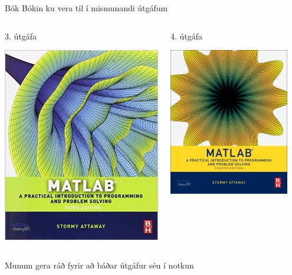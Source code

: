 \documentclass{beamer}
\begin{document}
\begin{frame}{Bók}
Bókin ku vera til í mismunandi útgáfum
\begin{columns}
\begin{center}
3. útgáfa

\includegraphics[width=0.66\linewidth]{Pics/matlab_stormy}
\end{center}
\begin{center}
4. útgáfa

\includegraphics[width=0.7\linewidth]{Pics/matlab_stormy_v4}
\end{center}
\end{columns}
Munum gera ráð fyrir að báðar útgáfur séu í notkun
\end{frame}
\end{document}
